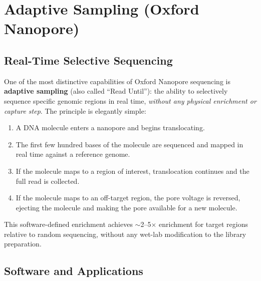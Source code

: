 \section{Adaptive Sampling (Oxford Nanopore)}
\label{sec:specialized:adaptive}

\subsection{Real-Time Selective Sequencing}
\label{subsec:specialized:adaptive-principle}

One of the most distinctive capabilities of Oxford Nanopore sequencing is \textbf{adaptive sampling} (also called ``Read Until''): the ability to selectively sequence specific genomic regions in real time, \textit{without any physical enrichment or capture step}. The principle is elegantly simple:

\begin{enumerate}[itemsep=2pt]
  \item A DNA molecule enters a nanopore and begins translocating.
  \item The first few hundred bases of the molecule are sequenced and mapped in real time against a reference genome.
  \item If the molecule maps to a region of interest, translocation continues and the full read is collected.
  \item If the molecule maps to an off-target region, the pore voltage is reversed, ejecting the molecule and making the pore available for a new molecule.
\end{enumerate}

This software-defined enrichment achieves $\sim$2--5$\times$ enrichment for target regions relative to random sequencing, without any wet-lab modification to the library preparation.

\subsection{Software and Applications}
\label{subsec:specialized:adaptive-software}

